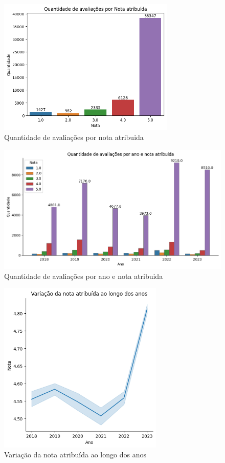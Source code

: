\begin{figure}
	\centering
	\includegraphics[width=0.75\textwidth]{figs/exploratoria/quantidade_avaliacao_nota_atribuida.png}
	\caption{Quantidade de avaliações por nota atribuida}
	\label{img:dist_review_rating}
\end{figure}

\begin{figure}
	\centering
	\includegraphics[width=1\textwidth]{figs/exploratoria/quantidade_avaliacao_nota_atribuida_ano.png}
	\caption{Quantidade de avaliações por ano e nota atribuida}
	\label{img:dist_review_rating_per_year}
\end{figure}

\begin{figure}
	\centering
	\includegraphics[width=0.70\textwidth]{figs/exploratoria/relplot_ano_rating.png}
	\caption{Variação da nota atribuída ao longo dos anos}
	\label{img:relplot_ano_rating}
\end{figure}

